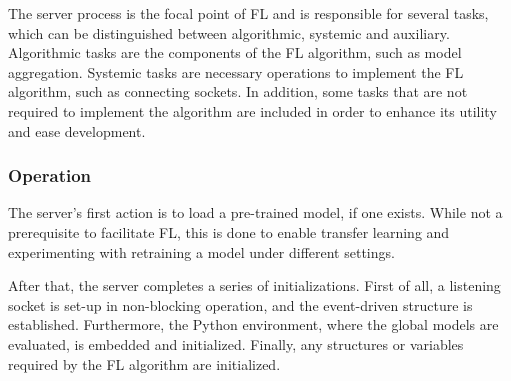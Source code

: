 The server process is the focal point of FL and is responsible for several tasks, which can be distinguished between algorithmic, systemic and auxiliary. Algorithmic tasks are the components of the FL algorithm, such as model aggregation. Systemic tasks are necessary operations to implement the FL algorithm, such as connecting sockets. In addition, some tasks that are not required to implement the algorithm are included in order to enhance its utility and ease development.

\subsubsection{Operation}
The server's first action is to load a pre-trained model, if one exists. While not a prerequisite to facilitate FL, this is done to enable transfer learning and experimenting with retraining a model under different settings. 

After that, the server completes a series of initializations. First of all, a listening socket is set-up in non-blocking operation, and the event-driven structure is established. Furthermore, the Python environment, where the global models are evaluated, is embedded and initialized. Finally, any structures or variables required by the FL algorithm are initialized.


